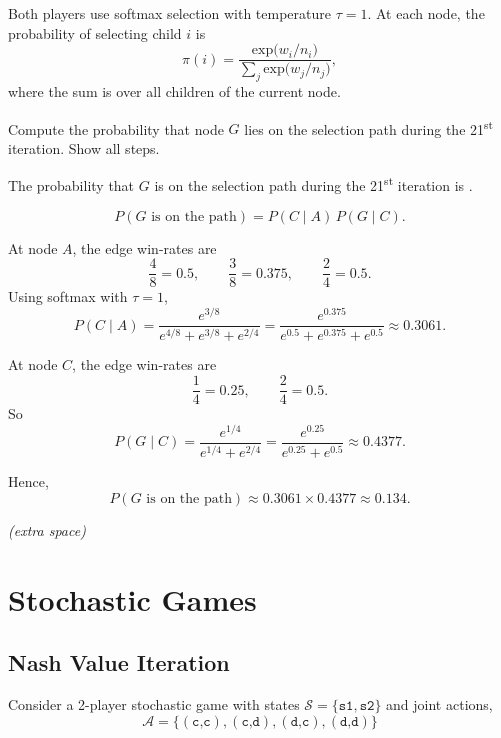 \begin{enumerate}
\noindent
Both players use softmax selection with temperature $\tau = 1$. At each
node, the probability of selecting child $i$ is
\[
  \pi(i) = \frac{\text{exp}\bigl(w_i/n_i\bigr)}{\displaystyle\sum_j \text{exp}\bigl(w_j/n_j\bigr)},
\]
where the sum is over all children of the current node.

\medskip\noindent
Compute the probability that node $G$ lies on the selection path during the
21\textsuperscript{st} iteration. Show all steps.

\medskip\noindent
The probability that $G$ is on the selection path during the 21\textsuperscript{st} iteration is .
\begin{solution}
\[
P(G \text{ is on the path}) = P(C\mid A)\,P(G\mid C).
\]

At node $A$, the edge win-rates are
\[
\frac{4}{8}=0.5,\qquad \frac{3}{8}=0.375,\qquad \frac{2}{4}=0.5.
\]
Using softmax with $\tau=1$,
\[
P(C\mid A)=\frac{e^{3/8}}{e^{4/8}+e^{3/8}+e^{2/4}}
=\frac{e^{0.375}}{e^{0.5}+e^{0.375}+e^{0.5}}
\approx 0.3061.
\]

At node $C$, the edge win-rates are
\[
\frac{1}{4}=0.25,\qquad \frac{2}{4}=0.5.
\]
So
\[
P(G\mid C)=\frac{e^{1/4}}{e^{1/4}+e^{2/4}}
=\frac{e^{0.25}}{e^{0.25}+e^{0.5}}
\approx 0.4377.
\]

Hence,
\[
P(G \text{ is on the path}) \approx 0.3061 \times 0.4377 \approx 0.134.
\]
\end{solution}
\vspace{140pt}

\end{enumerate}

\clearpage

\begin{center}
    \textit{(extra space)}
\end{center}

\clearpage

\section{\points[14] Stochastic Games}

\subsection{\points[14] Nash Value Iteration}

Consider a 2-player stochastic game with states $\mathcal{S}=\{\texttt{s1},\texttt{s2}\}$
and joint actions,
\[\mathcal{A}=\{(\texttt{c,c}),(\texttt{c,d}),(\texttt{d,c}),(\texttt{d,d})\}\]

